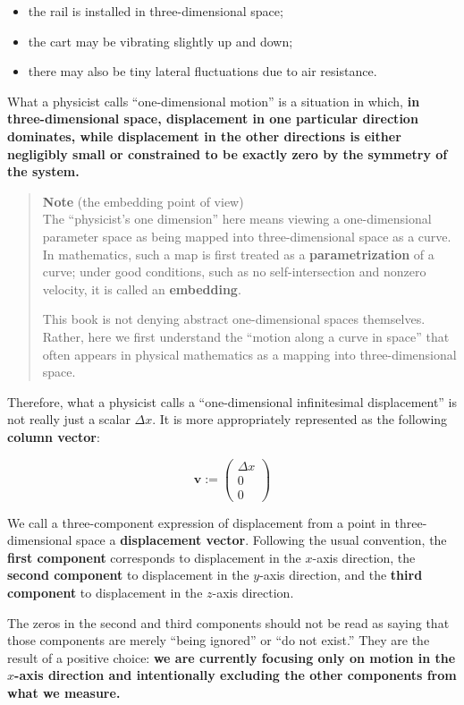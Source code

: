 \documentclass[a4paper,12pt,openany]{book}
\begin{document}
\begin{itemize}
\item
  the rail is installed in three-dimensional space;
\item
  the cart may be vibrating slightly up and down;
\item
  there may also be tiny lateral fluctuations due to air resistance.
\end{itemize}

What a physicist calls ``one-dimensional motion'' is a situation in
which,
\textbf{in three-dimensional space, displacement in one particular direction dominates, while displacement in the other directions is either negligibly small or constrained to be exactly zero by the symmetry of the system.}

\begin{quote}
\textbf{Note} (the embedding point of view)\\
The ``physicist's one dimension'' here means viewing a one-dimensional
parameter space as being mapped into three-dimensional space as a curve.
In mathematics, such a map is first treated as a
\textbf{parametrization} of a curve; under good conditions, such as no
self-intersection and nonzero velocity, it is called an
\textbf{embedding}.

This book is not denying abstract one-dimensional spaces themselves.
Rather, here we first understand the ``motion along a curve in space''
that often appears in physical mathematics as a mapping into
three-dimensional space.
\end{quote}

Therefore, what a physicist calls a ``one-dimensional infinitesimal
displacement'' is not really just a scalar \(\Delta x\). It is more
appropriately represented as the following \textbf{column vector}:

\[
\mathbf{v} :=
\begin{pmatrix}
\Delta x \\
0 \\
0
\end{pmatrix}
\]

We call a three-component expression of displacement from a point in
three-dimensional space a \textbf{displacement vector}. Following the
usual convention, the \textbf{first component} corresponds to
displacement in the \(x\)-axis direction, the \textbf{second component}
to displacement in the \(y\)-axis direction, and the
\textbf{third component} to displacement in the \(z\)-axis direction.

The zeros in the second and third components should not be read as
saying that those components are merely ``being ignored'' or ``do not
exist.'' They are the result of a positive choice:
\textbf{we are currently focusing only on motion in the $x$-axis direction and intentionally excluding the other components from what we measure.}
\end{document}
